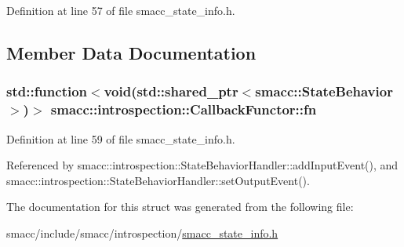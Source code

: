 Definition at line 57 of file smacc\+\_\+state\+\_\+info.\+h.



\subsection{Member Data Documentation}
\subsubsection[{\texorpdfstring{fn}{fn}}]{\setlength{\rightskip}{0pt plus 5cm}std\+::function$<$void(std\+::shared\+\_\+ptr$<${\bf smacc\+::\+State\+Behavior}$>$)$>$ smacc\+::introspection\+::\+Callback\+Functor\+::fn}\hypertarget{structsmacc_1_1introspection_1_1CallbackFunctor_a61ff14c7fccf031d0e4afa54470ac220}{}\label{structsmacc_1_1introspection_1_1CallbackFunctor_a61ff14c7fccf031d0e4afa54470ac220}


Definition at line 59 of file smacc\+\_\+state\+\_\+info.\+h.



Referenced by smacc\+::introspection\+::\+State\+Behavior\+Handler\+::add\+Input\+Event(), and smacc\+::introspection\+::\+State\+Behavior\+Handler\+::set\+Output\+Event().



The documentation for this struct was generated from the following file\+:\begin{DoxyCompactItemize}
\item 
smacc/include/smacc/introspection/\hyperlink{smacc__state__info_8h}{smacc\+\_\+state\+\_\+info.\+h}\end{DoxyCompactItemize}
